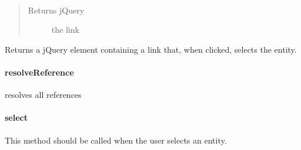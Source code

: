 \documentclass[letterpaper,10pt,english]{sphinxmanual}
\begin{document}
\begin{fulllineitems}
\label{ambrosia_web.entity.Entity:ambrosia_web.entity.Entity.getLink}~\begin{quote}\begin{description}
\item[{Returns jQuery}] \leavevmode
the link

\end{description}\end{quote}

\end{fulllineitems}


Returns a jQuery element containing a link that, when clicked, selects the entity.


\paragraph{resolveReference}
\label{ambrosia_web.entity.Entity:resolvereference}

\begin{fulllineitems}
\label{ambrosia_web.entity.Entity:ambrosia_web.entity.Entity.resolveReference}
\end{fulllineitems}


resolves all references




{\hyperref[ambrosia.model:ambrosia.model.Event.to_serializeable]{}}




\paragraph{select}
\label{ambrosia_web.entity.Entity:select}

\begin{fulllineitems}
\label{ambrosia_web.entity.Entity:ambrosia_web.entity.Entity.select}
\end{fulllineitems}


This method should be called when the user selects an entity.
\end{document}
